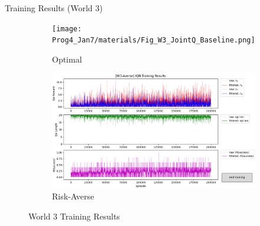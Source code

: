 \documentclass[aspectratio=1610, xcolor=dvipsnames]{packages/beamer}
\begin{document}
\begin{frame}{Training Results (World 3)}
     \begin{figure}
     \centering
          \begin{subfigure}[b]{\Wfig\textwidth}  \centering
              \texttt{[image: Prog4\_Jan7/materials/Fig\_W3\_JointQ\_Baseline.png]}
              \caption{Optimal} \label{fig:W3baseline}
          \end{subfigure}
          \hfill
         \begin{subfigure}[b]{\Wfig\textwidth} \centering
             \includegraphics[width=\textwidth]{../results/IDQN_W3/Fig_W3_JointQ_Averse}
             \caption{Risk-Averse} \label{fig:W3averse}
         \end{subfigure}
    \caption{World 3 Training Results}
    \label{fig:W3}
    \end{figure}
\end{frame}
\end{document}
